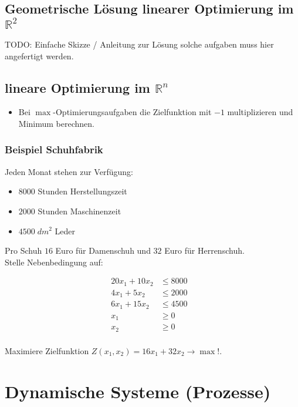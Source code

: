 \documentclass[a4paper]{article}
\newcommand{\R}{\mathbb{R}}
\begin{document}
\subsection{Geometrische Lösung linearer Optimierung im $\R ^2$}

TODO: Einfache Skizze / Anleitung zur Lösung solche aufgaben muss hier angefertigt
werden.

\subsection{lineare Optimierung im $\R ^{n}$}

\begin{itemize}
	\item Bei $\max$-Optimierungsaufgaben die Zielfunktion mit $-1$
		multiplizieren und Minimum berechnen.
\end{itemize}

\subsubsection{Beispiel Schuhfabrik}

Jeden Monat stehen zur Verfügung:

\begin{itemize}
	\item $8000$ Stunden Herstellungszeit
	\item $2000$ Stunden Maschinenzeit
	\item $4500\; dm ^2$ Leder
\end{itemize}

Pro Schuh $16$ Euro für Damenschuh und $32$ Euro für Herrenschuh.
\\

Stelle Nebenbedingung auf:

\begin{align*}
	20 x_1 + 10 x_2 & \leq 8000 \\
	4 x_1 + 5 x_2 & \leq 2000 \\
	6 x_1 + 15 x_2 & \leq 4500 \\
	x_1 & \geq 0 \\
	x_2 & \geq 0 & \\
\end{align*}

Maximiere Zielfunktion $Z(x_1, x_2) = 16 x_1 + 32 x_2 \rightarrow \max !$.

\section{Dynamische Systeme (Prozesse)}
\end{document}
